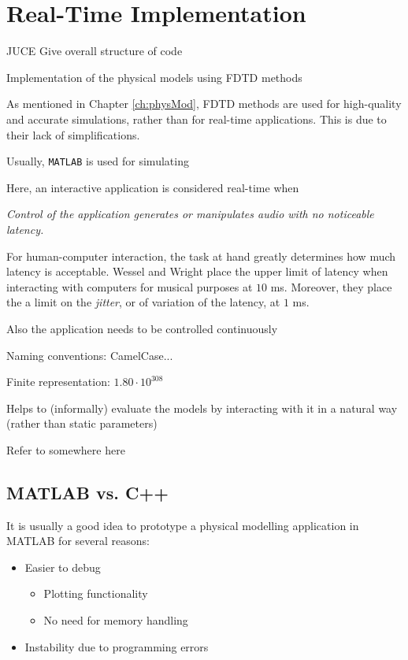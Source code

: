 \chapter{Real-Time Implementation}\label{ch:realtime}
JUCE
Give overall structure of code


Implementation of the physical models
using FDTD methods

As mentioned in Chapter \ref{ch:physMod}, FDTD methods are used for high-quality and accurate simulations, rather than for real-time applications. This is due to their lack of simplifications.

Usually, \texttt{MATLAB} is used for simulating 

Here, an interactive application is considered real-time when
\begin{center}\it
    Control of the application generates or manipulates audio with no noticeable latency.
\end{center}

For human-computer interaction, the task at hand greatly determines how much latency is acceptable. Wessel and Wright \cite{Wessel2002} place the upper limit of latency when interacting with computers for musical purposes at $10$ ms. Moreover, they place the a limit on the \textit{jitter}, or of variation of the latency, at $1$ ms. 

Also the application needs to be controlled continuously

Naming conventions: CamelCase...

Finite representation: $1.80\cdot 10^{308}$

Helps to (informally) evaluate the models by interacting with it in a natural way (rather than static parameters)
 
Refer to \cite{Webb2015} somewhere here

\section{MATLAB vs. C++}
It is usually a good idea to prototype a physical modelling application in MATLAB for several reasons:
\begin{itemize}
    \item Easier to debug
    \begin{itemize}
        \item Plotting functionality
        \item No need for memory handling
    \end{itemize}
    \item Instability due to programming errors 
\end{itemize}

